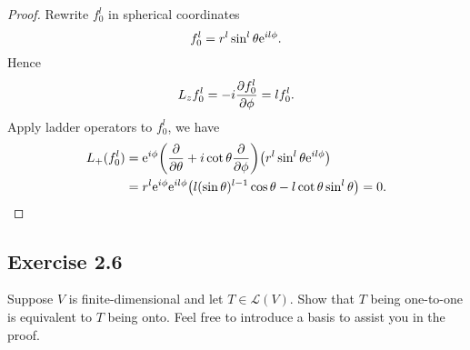 \documentclass[10pt]{article}
\begin{document}
\begin{enumerate}[(a)]
	\begin{proof}
		Rewrite $f_0^l$ in spherical coordinates
		\begin{equation}
			f_0^l = r^l \sin^l{\theta} {\mathrm{e}}^{il \phi}.
		\end{equation}
		Hence
		\begin{equation}
			L_z f_0^l = -i \pdv{f_0^l}{\phi} = l f_0^l.
		\end{equation}
		Apply ladder operators to $f_0^l$, we have
		\begin{align*}
			L_+(f_0^l) &= {\mathrm{e}}^{i \phi} \qty(\pdv{\theta} + i \cot{\theta} \pdv{\phi}) \qty(r^l \sin^l{\theta} {\mathrm{e}}^{il \phi}) \\
			&= r^l {\mathrm{e}}^{i \phi} {\mathrm{e}}^{il \phi} \qty(l (\sin{\theta})^{l-1} \cos{\theta} - l \cot{\theta} \sin^l{\theta}) = 0.
		\end{align*}
	\end{proof}
\end{enumerate}

\subsection{Exercise 2.6}
Suppose $V$ is finite-dimensional and let $T \in \mathcal{L}(V)$. Show that $T$ being one-to-one is equivalent to $T$ being onto. Feel free to introduce a basis to assist you in the proof.
\end{document}
